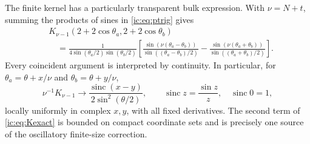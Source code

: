 \documentclass[11pt,a4paper]{article}
\numberwithin{equation}{section}
\theoremstyle{definition}
\theoremstyle{remark}
\newcommand{\sinc}{\operatorname{sinc}}
\begin{document}
The finite kernel has a particularly transparent bulk expression. With
$\nu=N+t$, summing the products of sines in \eqref{ic:eq:ptrig} gives
\begin{equation}\label{ic:eq:Kexact}
\begin{split}
 &K_{\nu-1}(2+2\cos\theta_a,2+2\cos\theta_b)\\
 &\quad=\frac1{4\sin(\theta_a/2)\sin(\theta_b/2)}
 \left[
 \frac{\sin(\nu(\theta_a-\theta_b))}{\sin((\theta_a-\theta_b)/2)}
 -\frac{\sin(\nu(\theta_a+\theta_b))}{\sin((\theta_a+\theta_b)/2)}
 \right].
\end{split}
\end{equation}
Every coincident argument is interpreted by continuity. In particular,
for $\theta_a=\theta+x/\nu$ and $\theta_b=\theta+y/\nu$,
\begin{equation}\label{ic:eq:Klimit}
 \nu^{-1}K_{\nu-1}\longrightarrow
 \frac{\sinc(x-y)}{2\sin^2(\theta/2)},
 \qquad \sinc z=\frac{\sin z}{z},\quad\sinc0=1,
\end{equation}
locally uniformly in complex $x,y$, with all fixed derivatives. The
second term of \eqref{ic:eq:Kexact} is bounded on compact coordinate sets
and is precisely one source of the oscillatory finite-size correction.
\end{document}
